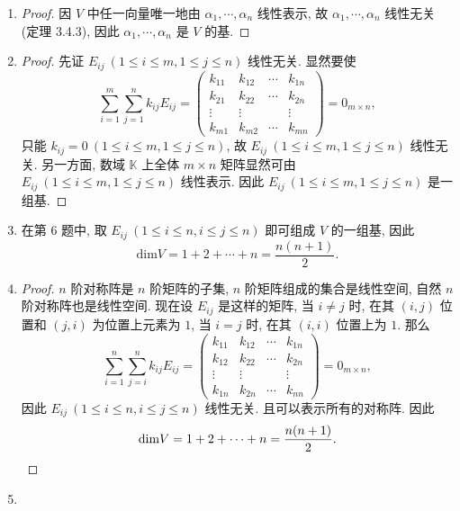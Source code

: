 \documentclass[a4paper, 11pt]{ctexart}
\begin{document}
\begin{enumerate}
    \item %
        \begin{proof}
            因 $V$ 中任一向量唯一地由 $\alpha_1, \cdots, \alpha_n$ 线性表示, 故 $\alpha_1, \cdots, \alpha_n$ 线性无关 (定理 3.4.3), 因此 $\alpha_1, \cdots, \alpha_n$ 是 $V$ 的基.
        \end{proof}
    \item %
        \begin{proof}
            先证 $E_{ij}\ (1 \leq i \leq m, 1 \leq j \leq n)$ 线性无关. 显然要使
            \[
                \sum_{i=1}^m\sum_{j=1}^nk_{ij}E_{ij} =
                \left(
                    \begin{array}{cccc}
                        k_{11} & k_{12} & \cdots & k_{1n} \\
                        k_{21} & k_{22} & \cdots & k_{2n} \\
                        \vdots & \vdots &  & \vdots \\
                        k_{m1} & k_{m2} & \cdots & k_{mn}
                    \end{array}    
                \right)
                = 0_{m\times n},  
            \]
            只能 $k_{ij} = 0\ (1 \leq i \leq m, 1 \leq j \leq n)$, 故 $E_{ij}\ (1 \leq i \leq m, 1 \leq j \leq n)$ 线性无关.
            另一方面, 数域 $\mathbb{K}$ 上全体 $m \times n$ 矩阵显然可由 $E_{ij}\ (1 \leq i \leq m, 1 \leq j \leq n)$ 线性表示.
            因此 $E_{ij}\ (1 \leq i \leq m, 1 \leq j \leq n)$ 是一组基.
        \end{proof}
    \item %
        在第 6 题中, 取 $E_{ij}\ (1 \leq i \leq n, i \leq j \leq n)$ 即可组成 $V$ 的一组基, 因此
        \[
            \mathrm{dim}V = 1 + 2 + \cdots + n = \frac{n(n+1)}{2}.    
        \]
    \item %
        \begin{proof}
            $n$ 阶对称阵是 $n$ 阶矩阵的子集, $n$ 阶矩阵组成的集合是线性空间, 自然 $n$ 阶对称阵也是线性空间.
            现在设 $E_{ij}$ 是这样的矩阵, 当 $i \not= j$ 时, 在其 $(i, j)$ 位置和 $(j, i)$ 为位置上元素为 $1$, 当 $i = j$ 时, 在其 $(i, i)$ 位置上为 $1$.
            那么
            \[
                \sum_{i=1}^n\sum_{j=i}^nk_{ij}E_{ij} =
                \left(
                    \begin{array}{cccc}
                        k_{11} & k_{12} & \cdots & k_{1n} \\
                        k_{12} & k_{22} & \cdots & k_{2n} \\
                        \vdots & \vdots &  & \vdots \\
                        k_{1n} & k_{2n} & \cdots & k_{nn}
                    \end{array}    
                \right)
                = 0_{m\times n},  
            \]
            因此 $E_{ij}\ (1 \leq i \leq n, i \leq j \leq n)$ 线性无关. 且可以表示所有的对称阵. 因此
            \[
                \mathrm{dim}V = 1 + 2 + \cdots + n = \frac{n(n+1)}{2}. \qedhere
            \]
        \end{proof}
    \item %
\end{enumerate}
\end{document}
